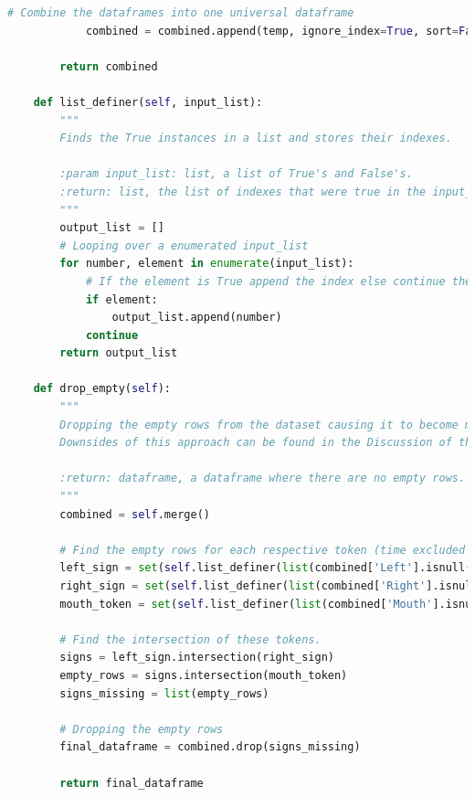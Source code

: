 \begin{lstlisting}[language=Python, caption=Shown is the Python code to merge the multiple CSV-files into one DataFrame.]
            # Combine the dataframes into one universal dataframe
            combined = combined.append(temp, ignore_index=True, sort=False)

        return combined

    def list_definer(self, input_list):
        """
        Finds the True instances in a list and stores their indexes.

        :param input_list: list, a list of True's and False's.
        :return: list, the list of indexes that were true in the input_list.
        """
        output_list = []
        # Looping over a enumerated input_list
        for number, element in enumerate(input_list):
            # If the element is True append the index else continue the loop
            if element:
                output_list.append(number)
            continue
        return output_list

    def drop_empty(self):
        """
        Dropping the empty rows from the dataset causing it to become more information packed.
        Downsides of this approach can be found in the Discussion of the written Thesis.

        :return: dataframe, a dataframe where there are no empty rows.
        """
        combined = self.merge()

        # Find the empty rows for each respective token (time excluded since it is always present).
        left_sign = set(self.list_definer(list(combined['Left'].isnull().values)))
        right_sign = set(self.list_definer(list(combined['Right'].isnull().values)))
        mouth_token = set(self.list_definer(list(combined['Mouth'].isnull().values)))

        # Find the intersection of these tokens.
        signs = left_sign.intersection(right_sign)
        empty_rows = signs.intersection(mouth_token)
        signs_missing = list(empty_rows)

        # Dropping the empty rows
        final_dataframe = combined.drop(signs_missing)

        return final_dataframe
\end{lstlisting}
 \break
{} \label{apx:fixing}
